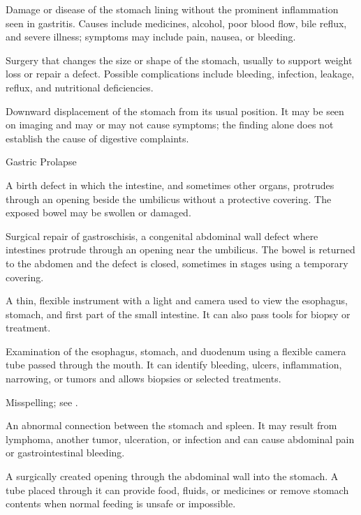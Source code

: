  Damage or disease of the stomach lining without the prominent inflammation seen in gastritis. Causes include medicines, alcohol, poor blood flow, bile reflux, and severe illness; symptoms may include pain, nausea, or bleeding.

 Surgery that changes the size or shape of the stomach, usually to support weight loss or repair a defect. Possible complications include bleeding, infection, leakage, reflux, and nutritional deficiencies.

 Downward displacement of the stomach from its usual position. It may be seen on imaging and may or may not cause symptoms; the finding alone does not establish the cause of digestive complaints.

\synonyms
Gastric Prolapse

 A birth defect in which the intestine, and sometimes other organs, protrudes through an opening beside the umbilicus without a protective covering. The exposed bowel may be swollen or damaged.

 Surgical repair of gastroschisis, a congenital abdominal wall defect where intestines protrude through an opening near the umbilicus. The bowel is returned to the abdomen and the defect is closed, sometimes in stages using a temporary covering.

 A thin, flexible instrument with a light and camera used to view the esophagus, stomach, and first part of the small intestine. It can also pass tools for biopsy or treatment.

 Examination of the esophagus, stomach, and duodenum using a flexible camera tube passed through the mouth. It can identify bleeding, ulcers, inflammation, narrowing, or tumors and allows biopsies or selected treatments.

 Misspelling; see .

 An abnormal connection between the stomach and spleen. It may result from lymphoma, another tumor, ulceration, or infection and can cause abdominal pain or gastrointestinal bleeding.

 A surgically created opening through the abdominal wall into the stomach. A tube placed through it can provide food, fluids, or medicines or remove stomach contents when normal feeding is unsafe or impossible.

